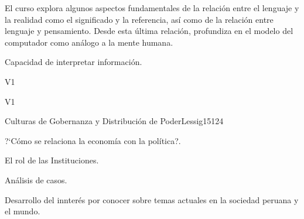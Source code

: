 \begin{syllabus}


\begin{justification}
El curso explora algunos aspectos fundamentales de la relación entre el lenguaje y la realidad como el significado y la referencia, así como de la relación entre lenguaje y pensamiento. Desde esta última relación, profundiza en el modelo del computador como análogo a la mente humana.
\end{justification}

\begin{goals}
\item Capacidad de interpretar información.
\end{goals}

\begin{outcomes}{V1}
    \item {}
    \item {}
    \item {}
    
\end{outcomes}

\begin{competences}{V1}
    \item {}
    \item {}
    \item {}
    \item {}
\end{competences}

\begin{unit}{Culturas de Gobernanza y Distribución de Poder}{}{Lessig15}{12}{4}
   \begin{topics}
      \item ?`Cómo se relaciona la economía con la política?.
      \item El rol de las Instituciones.
      \item Análisis de casos.
   \end{topics}
   \begin{learningoutcomes}
      \item Desarrollo del innterés por conocer sobre temas actuales en la sociedad peruana y el mundo.
   \end{learningoutcomes}
\end{unit}

\begin{coursebibliography}
\end{coursebibliography}

\end{syllabus}
